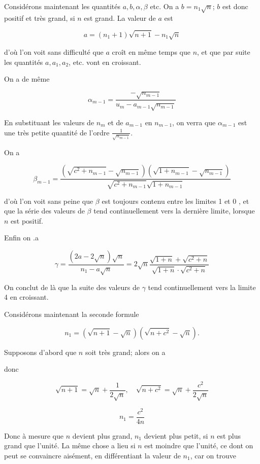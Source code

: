 \documentclass{article}
\begin{document}
Considérons maintenant les quantités \(a, b, \alpha, \beta\) etc. On a \(b=n_{1} \sqrt{n}\); \(b\) est donc positif et très grand, si \(n\) est grand. La valeur de \(a\) est

\[
a=\left(n_{1}+1\right) \sqrt{n+1}-n_{1} \sqrt{n}
\]

d'où l'on voit sans difficulté que \(a\) croît en même temps que \(n\), et que par suite les quantités \(a, a_{1}, a_{2}\), etc. vont en croissant.

On a de même

\[
\alpha_{m-1}=\frac{-\sqrt{n_{m-1}}}{u_{m}-a_{m-1} \sqrt{n_{m-1}}}
\]

En substituant les valeurs de \(n_{m}\) et de \(a_{m-1}\) en \(n_{m-1}\), on verra que \(\alpha_{m-1}\) est une très petite quantité de l'ordre \(\frac{1}{\sqrt{n_{m-1}}}\).

On a

\[
\beta_{m-1}=\frac{\left(\sqrt{c^{2}+n_{m-1}}-\sqrt{n_{m-1}}\right)\left(\sqrt{1+n_{m-1}}-\sqrt{n_{m-1}}\right)}{\sqrt{c^{2}+n_{m-1}} \sqrt{1+n_{m-1}}}
\]

d'où l'on voit sans peine que \(\beta\) est toujours contenu entre les limites 1 et 0 , et que la série des valeurs de \(\beta\) tend continuellement vers la dernière limite, lorsque \(n\) est positif.

Enfin on .a

\[
\gamma=\frac{(2 a-2 \sqrt{n}) \sqrt{n}}{n_{1}-a \sqrt{n}}=2 \sqrt{n} \frac{\sqrt{1+n}+\sqrt{c^{2}+n}}{\sqrt{1+n} \cdot \sqrt{c^{2}+n}}
\]

On conclut de là que la suite des valeurs de \(\gamma\) tend continuellement vers la limite 4 en croissant.

Considérons maintenant la seconde formule

\[
n_{1}=(\sqrt{n+1}-\sqrt{n})\left(\sqrt{n+c^{2}}-\sqrt{n}\right) .
\]

Supposons d'abord que \(n\) soit très grand; alors on a

donc

\[
\sqrt{n+1}=\sqrt{n}+\frac{1}{2 \sqrt{n}}, \quad \sqrt{n+c^{2}}=\sqrt{n}+\frac{c^{2}}{2 \sqrt{n}}
\]

\[
n_{1}=\frac{c^{2}}{4 n}
\]

Donc à mesure que \(n\) devient plus grand, \(n_{1}\) devient plus petit, si \(n\) est plus grand que l'unité. La même chose a lieu si \(n\) est moindre que l'unité, ce dont on peut se convaincre aisément, en différentiant la valeur de \(n_{1}\), car on trouve
\end{document}

